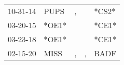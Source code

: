 \begin{supertabular}{lllll}
 10-31-14 &   PUPS &  , &    &  *CS2* \\
 03-20-15 &  *OE1* &    &    &  *CE1* \\
 03-23-18 &  *OE1* &    &    &  *CE1* \\
 02-15-20 &   MISS &  , &  , &   BADF \\
\end{supertabular}
